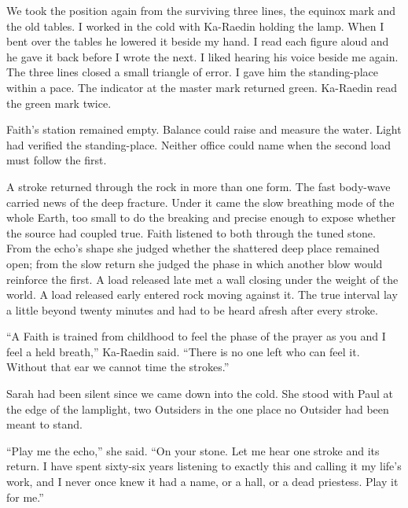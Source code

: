 We took the position again from the surviving three lines, the equinox mark and the old tables. I worked in the cold with Ka-Raedin holding the lamp. When I bent over the tables he lowered it beside my hand. I read each figure aloud and he gave it back before I wrote the next. I liked hearing his voice beside me again. The three lines closed a small triangle of error. I gave him the standing-place within a pace. The indicator at the master mark returned green. Ka-Raedin read the green mark twice.\par

\ornament

Faith's station remained empty. Balance could raise and measure the water. Light had verified the standing-place. Neither office could name when the second load must follow the first.\par

A stroke returned through the rock in more than one form. The fast body-wave carried news of the deep fracture. Under it came the slow breathing mode of the whole Earth, too small to do the breaking and precise enough to expose whether the source had coupled true. Faith listened to both through the tuned stone. From the echo's shape she judged whether the shattered deep place remained open; from the slow return she judged the phase in which another blow would reinforce the first. A load released late met a wall closing under the weight of the world. A load released early entered rock moving against it. The true interval lay a little beyond twenty minutes and had to be heard afresh after every stroke.\par

``A Faith is trained from childhood to feel the phase of the prayer as you and I feel a held breath,'' Ka-Raedin said. ``There is no one left who can feel it. Without that ear we cannot time the strokes.''\par

Sarah had been silent since we came down into the cold. She stood with Paul at the edge of the lamplight, two Outsiders in the one place no Outsider had been meant to stand.\par

``Play me the echo,'' she said. ``On your stone. Let me hear one stroke and its return. I have spent sixty-six years listening to exactly this and calling it my life's work, and I never once knew it had a name, or a hall, or a dead priestess. Play it for me.''\par

\ornament


